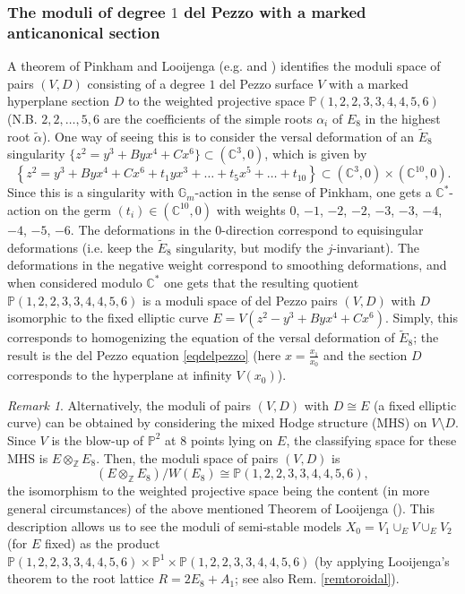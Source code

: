 \documentclass{amsart}
\numberwithin{equation}{section}
\theoremstyle{plain}
\theoremstyle{remark}
\newtheorem{remark}[equation]{Remark}
\theoremstyle{definition}
\newcommand{\bP}{\mathbb{P}}
\newcommand{\bZ}{\mathbb{Z}}
\newcommand{\bC}{\mathbb{C}}
\newcommand{\Gm}{\mathbb{G}_m}
\newcommand{\Ee}{\widetilde{E}_8}
\begin{document}
\subsubsection{The moduli of degree $1$ del Pezzo with a marked anticanonical section}
A theorem of Pinkham and Looijenga (e.g. \cite{pinkham} and \cite{looijengainv,looijengasimple}) identifies the moduli space of pairs $(V,D)$ consisting of a degree $1$ del Pezzo surface $V$ with a marked hyperplane section $D$ to the weighted projective space $\bP(1,2,2,3,3,4,4,5,6)$ (N.B. $2,2,\dots,5,6$ are  the coefficients of the simple roots $\alpha_i$ of $E_8$ in the highest root $\widetilde \alpha$). One way of seeing this is to consider the versal deformation of an $\Ee$ singularity $\{z^2=y^3+Byx^4+Cx^6\}\subset (\bC^3,0)$,  which is given by 
\begin{equation}\label{eqversal}
\left\{z^2=y^3+Byx^4+Cx^6+t_1yx^3+\dots+t_5x^5+\dots+t_{10}\right\}\subset (\bC^3,0)\times (\bC^{10},0).
\end{equation}
Since this is a singularity with  $\Gm$-action in the sense of Pinkham, one gets a $\bC^*$-action on the germ $(t_i)\in (\bC^{10},0)$ with weights $0$, $-1$, $-2$, $-2$, $-3$, $-3$, $-4$, $-4$, $-5$, $-6$. The deformations in the $0$-direction correspond to equisingular deformations (i.e. keep the $\Ee$ singularity, but modify the $j$-invariant). The deformations in the negative weight correspond to smoothing deformations, and when considered modulo $\bC^*$ one gets that the resulting quotient $\bP(1,2,2,3,3,4,4,5,6)$ is a moduli space of del Pezzo pairs  $(V,D)$ with $D$ isomorphic to the fixed elliptic curve $E=V(z^2-y^3+Byx^4+Cx^6)$. Simply, this corresponds to homogenizing the equation of the versal deformation of $\Ee$; the result is  the del Pezzo equation \eqref{eqdelpezzo} (here $x=\frac{x_1}{x_0}$ and the section $D$ corresponds to the hyperplane at infinity $V(x_0)$). 

\begin{remark} \label{remstructure2e8a1}
Alternatively, the moduli of pairs $(V,D)$ with $D\cong E$ (a fixed elliptic curve) can be obtained by  considering the mixed Hodge structure (MHS) on $V\setminus D$. Since $V$ is the blow-up of $\bP^2$ at $8$ points lying on $E$, the classifying space for these MHS is $E\otimes_\bZ E_8$. Then, the moduli space of pairs $(V,D)$ is 
$$(E\otimes_\bZ E_8)/W(E_8)\cong\bP(1,2,2,3,3,4,4,5,6),$$
the isomorphism to the weighted projective space being the content (in more general circumstances) of the above mentioned Theorem of Looijenga (\cite{looijengainv}). This description allows us to see the moduli of semi-stable models $X_0=V_1\cup_EV\cup_EV_2$ (for $E$ fixed) as the product $\bP(1,2,2,3,3,4,4,5,6)\times \bP^1\times \bP(1,2,2,3,3,4,4,5,6)$ (by applying Looijenga's theorem to the root lattice $R=2E_8+A_1$; see also Rem. \ref{remtoroidal}). 
\end{remark}
\end{document}
